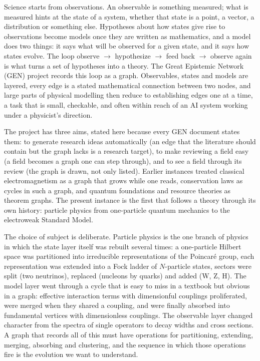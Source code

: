 \documentclass[11pt,a4paper]{article}
\newcommand{\gen}{Great Epistemic Network}
\begin{document}
Science starts from observations. An observable is something measured; what is measured hints at the state of a system, whether that state is a point, a vector, a distribution or something else. Hypotheses about how states give rise to observations become models once they are written as mathematics, and a model does two things: it says what will be observed for a given state, and it says how states evolve. The loop observe $\to$ hypothesize $\to$ feed back $\to$ observe again is what turns a set of hypotheses into a theory. The \gen{} (GEN) project records this loop as a graph. Observables, states and models are layered, every edge is a stated mathematical connection between two nodes, and large parts of physical modelling then reduce to establishing edges one at a time, a task that is small, checkable, and often within reach of an AI system working under a physicist's direction.

The project has three aims, stated here because every GEN document states them: to generate research ideas automatically (an edge that the literature should contain but the graph lacks is a research target), to make reviewing a field easy (a field becomes a graph one can step through), and to see a field through its review (the graph is drawn, not only listed). Earlier instances treated classical electromagnetism as a graph that grows while one reads, conservation laws as cycles in such a graph, and quantum foundations and resource theories as theorem graphs. The present instance is the first that follows a theory through its own history: particle physics from one-particle quantum mechanics to the electroweak Standard Model.

The choice of subject is deliberate. Particle physics is the one branch of physics in which the state layer itself was rebuilt several times: a one-particle Hilbert space was partitioned into irreducible representations of the Poincaré group, each representation was extended into a Fock ladder of $N$-particle states, sectors were split (two neutrinos), replaced (nucleons by quarks) and added (W, Z, H). The model layer went through a cycle that is easy to miss in a textbook but obvious in a graph: effective interaction terms with dimensionful couplings proliferated, were merged when they shared a coupling, and were finally absorbed into fundamental vertices with dimensionless couplings. The observable layer changed character from the spectra of single operators to decay widths and cross sections. A graph that records all of this must have operations for partitioning, extending, merging, absorbing and clustering, and the sequence in which those operations fire is the evolution we want to understand.
\end{document}
